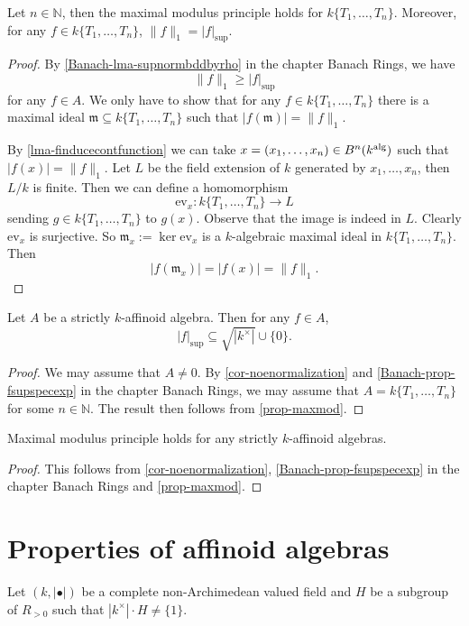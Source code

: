 \begin{proposition}\label{prop-maxmod}
    Let $n\in \mathbb{N}$, then the maximal modulus principle holds for $k\{T_1,\ldots,T_n\}$. Moreover, for any $f\in k\{T_1,\ldots,T_n\}$, $\|f\|_1=|f|_{\sup}$.
\end{proposition}
\begin{proof}
    By \cref{Banach-lma-supnormbddbyrho} in the chapter Banach Rings, we have
    \[
        \|f\|_1\geq |f|_{\sup}
    \]
    for any $f\in A$. We only have to show that for any $f\in k\{T_1,\ldots,T_n\}$ there is a maximal ideal $\mathfrak{m}\subseteq k\{T_1,\ldots,T_n\}$ such that $|f(\mathfrak{m})|=\|f\|_1$.

    By \cref{lma-finducecontfunction} we can take $x=(x_1,\ldots,x_n)\in B^n(k^{\mathrm{alg}})$ such that $|f(x)|=\|f\|_1$. Let $L$ be the field extension of $k$ generated by $x_1,\ldots,x_n$, then $L/k$ is finite. Then we can define a homomorphism
    \[
        \mathrm{ev}_x:  k\{T_1,\ldots,T_n\} \rightarrow L
    \]
    sending $g\in k\{T_1,\ldots,T_n\}$ to $g(x)$. Observe that the image is indeed in $L$. Clearly $\mathrm{ev}_x$ is surjective. So $\mathfrak{m}_x:=\ker \mathrm{ev}_x$ is a $k$-algebraic maximal ideal in $k\{T_1,\ldots,T_n\}$. Then
    \[
        |f(\mathfrak{m}_x)|=|f(x)|=\|f\|_1.  
    \]
\end{proof}


\begin{corollary}\label{cor-strictlyaffsupnorm}
    Let $A$ be a strictly $k$-affinoid algebra. Then for any $f\in A$,
    \[
        |f|_{\sup}\subseteq \sqrt{|k^{\times}|}\cup \{0\}.  
    \]
\end{corollary}
\begin{proof}
    We may assume that $A\neq 0$.
    By \cref{cor-noenormalization} and \cref{Banach-prop-fsupspecexp} in the chapter Banach Rings, we may assume that $A=k\{T_1,\ldots,T_n\}$ for some $n\in \mathbb{N}$. The result then follows from \cref{prop-maxmod}.
\end{proof}


\begin{corollary}\label{cor:maxmodprin}
    Maximal modulus principle holds for any strictly $k$-affinoid algebras.
\end{corollary}
\begin{proof}
    This follows from \cref{cor-noenormalization}, \cref{Banach-prop-fsupspecexp} in the chapter Banach Rings and \cref{prop-maxmod}.
\end{proof}


\section{Properties of affinoid algebras}
Let $(k,|\bullet|)$ be a complete non-Archimedean valued field and $H$ be a subgroup of $R_{>0}$ such that $|k^{\times}|\cdot H\neq \{1\}$.

